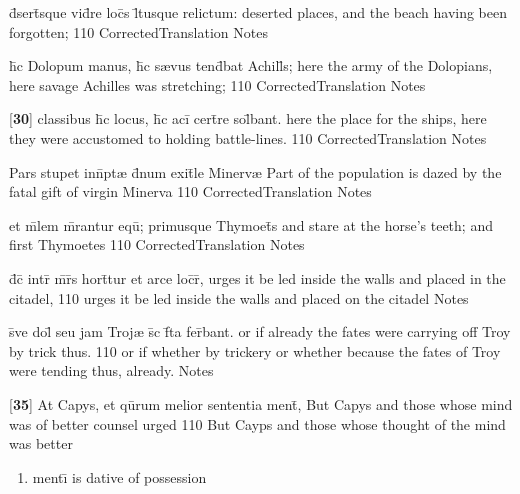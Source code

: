 \latline
  {d\={}sert\={}sque vid\={}re loc\={}s l\={\macron {\i}}tusque relictum:}
  { deserted places, and the beach having been forgotten; }
  {110}
  { CorrectedTranslation }
  { Notes }


\latline
  {h\={\macron {\i}}c Dolopum manus, h\={\macron {\i}}c s{\ae}vus tend\={}bat Achill\={}s;}
  { here the army of the Dolopians, here savage Achilles was stretching; }
  {110}
  { CorrectedTranslation }
  { Notes }


\latline
  {[\textbf{30}] classibus h\={\macron {\i}}c locus, h\={\macron {\i}}c aci\={} cert\={}re sol\={}bant.}
  { here the place for the ships, here they were accustomed to holding battle-lines. }
  {110}
  { CorrectedTranslation }
  { Notes }


\latline
  {Pars stupet inn\={}pt{\ae} d\={}num exit\={}le Minerv{\ae}}
  { Part of the population is dazed by the fatal gift of virgin Minerva }
  {110}
  { CorrectedTranslation }
  { Notes }


\latline
  {et m\={}lem m\={\macron {\i}}rantur equ\={\macron {\i}}; primusque Thymoet\={}s}
  { and stare at the horse's teeth; and first Thymoetes  }
  {110}
  { CorrectedTranslation }
  { Notes }


\latline
  {d\={}c\={\macron {\i}} intr\={} m\={}r\={}s hort\={}tur et arce loc\={}r\={\macron {\i}},}
  { urges it be led inside the walls and placed in the citadel, }
  {110}
  { urges it be led inside the walls and placed on the citadel }
  { Notes }


\latline
  {s\={\macron {\i}}ve dol\={} seu jam Troj{\ae} s\={\macron {\i}}c f\={}ta fer\={}bant.}
  { or if already the fates were carrying off Troy by trick thus. }
  {110}
  { or if whether by trickery or whether because the fates of Troy were tending thus, already. }
  { Notes }


\latline
  {[\textbf{35}] At Capys, et qu\={}rum melior sententia ment\={\macron {\i}},}
  { But Capys and those whose mind was of better counsel urged }
  {110}
  { But Cayps and those whose thought of the mind was better }
  { \begin{enumerate}
  	\item ment\={\i} is dative of possession
  \end{enumerate} }



